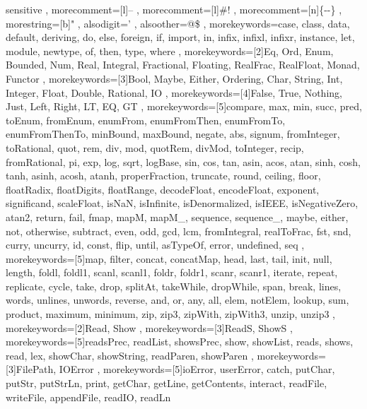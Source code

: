 %
%
%
{ sensitive%
, morecomment=[l]--%
, morecomment=[l]\#!%
, morecomment=[n]{\{-}{-\}}%
, morestring=[b]"%
, alsodigit={'}%
, alsoother={@\$}%
%
%
%
, morekeywords={case, class, data, default, deriving, do, else, foreign, if, import, in, infix, infixl, infixr, instance, let, module, newtype, of, then, type, where}%
%
, morekeywords=[2]{Eq, Ord, Enum, Bounded, Num, Real, Integral, Fractional, Floating, RealFrac, RealFloat, Monad, Functor}%
, morekeywords=[3]{Bool, Maybe, Either, Ordering, Char, String, Int, Integer, Float, Double, Rational, IO}%
, morekeywords=[4]{False, True, Nothing, Just, Left, Right, LT, EQ, GT}%
, morekeywords=[5]{compare, max, min, succ, pred, toEnum, fromEnum, enumFrom, enumFromThen, enumFromTo, enumFromThenTo, minBound, maxBound, negate, abs, signum, fromInteger, toRational, quot, rem, div, mod, quotRem, divMod, toInteger, recip, fromRational, pi, exp, log, sqrt, logBase, sin, cos, tan, asin, acos, atan, sinh, cosh, tanh, asinh, acosh, atanh, properFraction, truncate, round, ceiling, floor, floatRadix, floatDigits, floatRange, decodeFloat, encodeFloat, exponent, significand, scaleFloat, isNaN, isInfinite, isDenormalized, isIEEE, isNegativeZero, atan2, return, fail, fmap, mapM, mapM_, sequence, sequence_, maybe, either, not, otherwise, subtract, even, odd, gcd, lcm, fromIntegral, realToFrac, fst, snd, curry, uncurry, id, const, flip, until, asTypeOf, error, undefined, seq}%
%
, morekeywords=[5]{map, filter, concat, concatMap, head, last, tail, init, null, length, foldl, foldl1, scanl, scanl1, foldr, foldr1, scanr, scanr1, iterate, repeat, replicate, cycle, take, drop, splitAt, takeWhile, dropWhile, span, break, lines, words, unlines, unwords, reverse, and, or, any, all, elem, notElem, lookup, sum, product, maximum, minimum, zip, zip3, zipWith, zipWith3, unzip, unzip3}%
%
, morekeywords=[2]{Read, Show}%
, morekeywords=[3]{ReadS, ShowS}%
, morekeywords=[5]{readsPrec, readList, showsPrec, show, showList, reads, shows, read, lex, showChar, showString, readParen, showParen}%
%
, morekeywords=[3]{FilePath, IOError}%
, morekeywords=[5]{ioError, userError, catch, putChar, putStr, putStrLn, print, getChar, getLine, getContents, interact, readFile, writeFile, appendFile, readIO, readLn}%
}%
